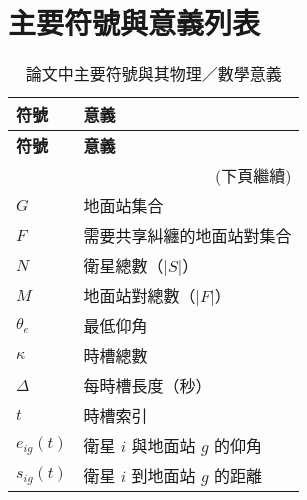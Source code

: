 \documentclass[12pt,a4paper]{article}
\begin{document}

\vspace{2em}


\vspace{2em}

\section{主要符號與意義列表}
\begin{longtable}{p{} p{}}
\caption{論文中主要符號與其物理／數學意義}\\
\toprule
\textbf{符號} & \textbf{意義} \\
\midrule
\endfirsthead
\toprule
\textbf{符號} & \textbf{意義} \\
\midrule
\endhead
\midrule
\multicolumn{2}{r}{(下頁繼續)}
\endfoot
\bottomrule
\endlastfoot

\textbf{\(S\)} & 衛星集合\\
\textbf{\(G\)} & 地面站集合\\
\textbf{\(F\)} & 需要共享糾纏的地面站對集合\\
\textbf{\(N\)} & 衛星總數（\(\lvert S\rvert\)）\\
\textbf{\(M\)} & 地面站對總數（\(\lvert F\rvert\)）\\
\textbf{\(\theta_e\)} & 最低仰角\\
\textbf{\(\kappa\)} & 時槽總數\\
\textbf{\(\Delta\)} & 每時槽長度（秒）\\
\textbf{\(t\)} & 時槽索引\\
\textbf{\(e_{ig}(t)\)} & 衛星 \(i\) 與地面站 \(g\) 的仰角\\
\textbf{\(s_{ig}(t)\)} & 衛星 \(i\) 到地面站 \(g\) 的距離\\
\end{longtable}
\end{document}
